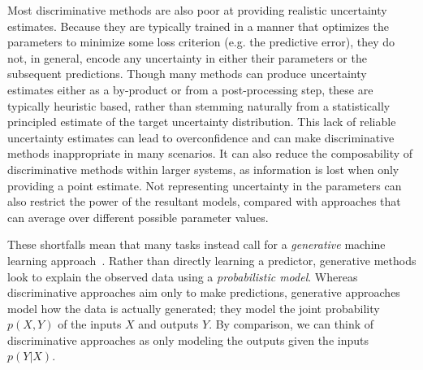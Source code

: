 Most discriminative methods are also poor at providing realistic uncertainty estimates.
Because they are typically trained in a manner that optimizes the parameters to minimize
some loss criterion (e.g. the predictive error), they do not, in general, encode any uncertainty
in either their parameters or the subsequent predictions.  Though many methods can
produce uncertainty estimates either as a by-product or from a post-processing step,
these are typically heuristic based, rather than stemming naturally from a statistically
principled estimate of the target uncertainty distribution.   This lack of reliable uncertainty
estimates can lead to overconfidence and can make discriminative methods inappropriate in
many scenarios.  It can also reduce the composability of discriminative methods within
larger systems, as information is lost when only providing a point estimate.
Not representing uncertainty in the parameters can also restrict the power of the resultant
models, compared with approaches that can average over different possible parameter values.

These shortfalls mean that many tasks instead call for a \emph{generative} machine learning
approach~\citep{ng2002discriminative,bishop2006pattern}.  Rather than directly learning a 
predictor, generative methods look to explain the observed data using a \emph{probabilistic model}.
Whereas discriminative approaches aim only to make predictions, generative approaches model
how the data is actually generated; they model the joint probability $p(X,Y)$ of the inputs 
$X$ and outputs $Y$.  By comparison, we can think of discriminative approaches as
only modeling the outputs given the inputs $p(Y|X)$.  

